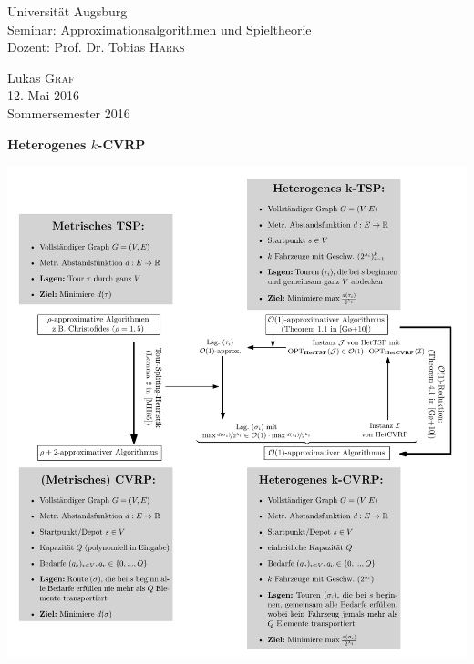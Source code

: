 \documentclass[a4paper,ngerman,12pt,bibtotoc]{scrartcl}
\theoremstyle{definition}
\theoremstyle{plain}
\theoremstyle{remark}
\begin{document}
	
	\begin{minipage}{0.7\textwidth}
		\begin{flushleft}
			Universität Augsburg \\
			Seminar: Approximationsalgorithmen und Spieltheorie \\
			Dozent: Prof. Dr. Tobias \textsc{Harks} 
		\end{flushleft}
	\end{minipage}
	\begin{minipage}{0.3\textwidth}
		\begin{flushright}
			Lukas \textsc{Graf} \\
			12. Mai 2016 \\
			Sommersemester 2016
		\end{flushright}
	\end{minipage}
	
	\hrulefill
	\vspace{-1em}
	\begin{center}\LARGE\textbf{Heterogenes $k$-CVRP}\end{center}
	\vspace{-1.4em}
	\hrulefill
	\vspace{-1.4em}
	
	\hrulefill
	
	\vspace{1em}	
	\includegraphics[width=1\textwidth]{Problemdefinitionen2.pdf}
\end{document}
